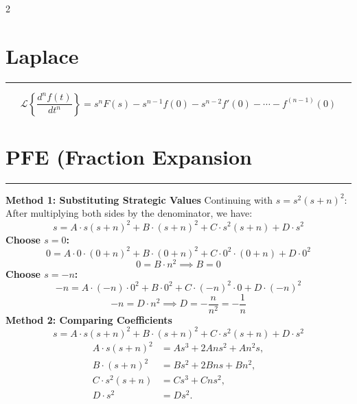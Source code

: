 \documentclass[letterpaper,10pt]{article}
\let\oldsection\section
\renewcommand{\section}[1]{%
\vspace{-1em}
  \oldsection{#1}%
  \par\vspace{-2em}%
  \noindent\rule{0.5\textwidth}{0.5pt}%
  \vspace{0em}%
}
\begin{document}
\begin{multicols}{2}
\section{Laplace}
\[
\mathcal{L}\left\{\frac{d^n f(t)}{dt^n}\right\} = s^n F(s) - s^{n-1}f(0) - s^{n-2}f'(0) - \cdots - f^{(n-1)}(0)
\]

\section{PFE (Fraction Expansion}
\textbf{Method 1: Substituting Strategic Values}\newline
Continuing with \( s = s^2(s + n)^2 \):\newline
After multiplying both sides by the denominator, we have:
\begin{equation*}
s = A \cdot s(s + n)^2 + B \cdot (s + n)^2 + C \cdot s^2(s + n) + D \cdot s^2
\end{equation*}
\textbf{Choose \( s = 0 \):}
    \begin{equation*}
    0 = A \cdot 0 \cdot (0 + n)^2 + B \cdot (0 + n)^2 + C \cdot 0^2 \cdot (0 + n) + D \cdot 0^2
    \end{equation*}
    \begin{equation*}
    0 = B \cdot n^2 \implies B = 0
    \end{equation*}
\textbf{Choose \( s = -n \):}
    \begin{equation*}
    -n = A \cdot (-n) \cdot 0^2 + B \cdot 0^2 + C \cdot (-n)^2 \cdot 0 + D \cdot (-n)^2
    \end{equation*}
    \begin{equation*}
    -n = D \cdot n^2 \implies D = -\frac{n}{n^2} = -\frac{1}{n}
    \end{equation*}
\newline
\textbf{Method 2: Comparing Coefficients}
\vspace{-0.5em}
\begin{equation*}
s = A \cdot s(s + n)^2 + B \cdot (s + n)^2 + C \cdot s^2(s + n) + D \cdot s^2
\end{equation*}
\vspace{-2em}
\begin{align*}
A \cdot s(s + n)^2 &= A s^3 + 2A n s^2 + A n^2 s, \\
B \cdot (s + n)^2 &= B s^2 + 2B n s + B n^2, \\
C \cdot s^2(s + n) &= C s^3 + C n s^2, \\
D \cdot s^2 &= D s^2.

\end{align*}
\end{multicols}
\end{document}

